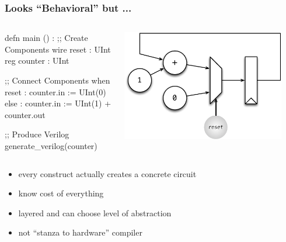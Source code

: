 \documentclass[xcolor=pdflatex,dvipsnames,table]{beamer}
\begin{document}
\begin{frame}[fragile]
\frametitle{Looks ``Behavioral'' but ...}
\begin{columns}
{
\begin{stanza}
defn main () :
  ;; Create Components
  wire reset  : UInt
  reg counter : UInt

  ;; Connect Components
  when reset :
    counter.in := UInt(0)
  else :
    counter.in := UInt(1) + counter.out

  ;; Produce Verilog
  generate_verilog(counter)
\end{stanza}
}
\begin{center}
\includegraphics[width=0.9\textwidth]{figs/simple-counter.pdf}
\end{center}
\end{columns}
\begin{itemize}
\item every construct actually creates a concrete circuit
\item know cost of everything
\item layered and can choose level of abstraction
\item {\color{red}not ``stanza to hardware'' compiler}
\end{itemize}
\end{frame}
\end{document}
